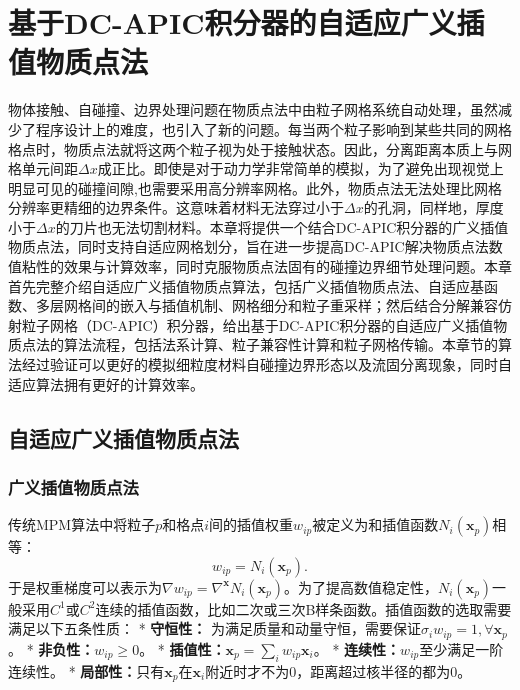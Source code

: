 \chapter{基于DC-APIC积分器的自适应广义插值物质点法}
物体接触、自碰撞、边界处理问题在物质点法中由粒子网格系统自动处理，虽然减少了程序设计上的难度，也引入了新的问题。每当两个粒子影响到某些共同的网格格点时，物质点法就将这两个粒子视为处于接触状态。因此，分离距离本质上与网格单元间距$\Delta x$成正比。即使是对于动力学非常简单的模拟，为了避免出现视觉上明显可见的碰撞间隙,也需要采用高分辨率网格。此外，物质点法无法处理比网格分辨率更精细的边界条件。这意味着材料无法穿过小于$\Delta x$的孔洞，同样地，厚度小于$\Delta x$的刀片也无法切割材料。本章将提供一个结合DC-APIC积分器的广义插值物质点法，同时支持自适应网格划分，旨在进一步提高DC-APIC解决物质点法数值粘性的效果与计算效率，同时克服物质点法固有的碰撞边界细节处理问题。本章首先完整介绍自适应广义插值物质点算法，包括广义插值物质点法、自适应基函数、多层网格间的嵌入与插值机制、网格细分和粒子重采样；然后结合分解兼容仿射粒子网格（DC-APIC）积分器，给出基于DC-APIC积分器的自适应广义插值物质点法的算法流程，包括法系计算、粒子兼容性计算和粒子网格传输。本章节的算法经过验证可以更好的模拟细粒度材料自碰撞边界形态以及流固分离现象，同时自适应算法拥有更好的计算效率。

\section{自适应广义插值物质点法}

\subsection{广义插值物质点法}
传统MPM算法中将粒子$p$和格点$i$间的插值权重$w_{ip}$被定义为和插值函数$N_i(\mathbf{x}_p)$相等：
\begin{equation}
    w_{ip} = N_i(\mathbf{x}_p).
\end{equation}
于是权重梯度可以表示为$\nabla w_{ip} = \nabla^{\mathbf{x}}N_i(\mathbf{x}_p)$。为了提高数值稳定性，$N_i(\mathbf{x}_p)$一般采用$C^1$或$C^2$连续的插值函数，比如二次或三次B样条函数。插值函数的选取需要满足以下五条性质：
* \textbf{守恒性：} 为满足质量和动量守恒，需要保证$\sigma_iw_{ip}=1,\forall \mathbf{x}_p$。
* \textbf{非负性：}$w_{ip}\geq 0$。
* \textbf{插值性：}$\mathbf{x}_p=\sum_iw_{ip}\mathbf{x}_i$。
* \textbf{连续性：}$w_{ip}$至少满足一阶连续性。
* \textbf{局部性：}只有$\mathbf{x}_p$在$\mathbf{x}_i$附近时才不为0，距离超过核半径的都为0。

